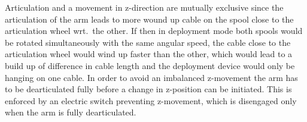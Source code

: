 Articulation and a movement in z-direction are mutually exclusive since the articulation of the arm leads to more wound up cable on the spool close to the articulation wheel wrt.~the other. If then in deployment mode both spools would be rotated simultaneously with the same angular speed, the cable close to the articulation wheel would wind up faster than the other, which would lead to a build up of difference in cable length and the deployment device would only be hanging on one cable. In order to avoid an imbalanced z-movement the arm has to be dearticulated fully before a change in z-position can be initiated. This is enforced by an electric switch preventing z-movement, which is disengaged only when the arm is fully dearticulated. 


